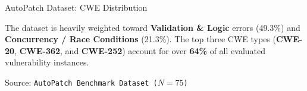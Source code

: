 \documentclass[aspectratio=169,10pt]{beamer}
\begin{document}
\begin{frame}{AutoPatch Dataset: CWE Distribution}
  \vspace{0.25em}
  \begin{tcolorbox}[colback=hit!5, colframe=hit!70!black, boxrule=0.35pt,
    left=3pt, right=3pt, top=2pt, bottom=1pt, arc=2pt, width=\linewidth]
    \scriptsize
    The dataset is heavily weighted toward \textbf{Validation \& Logic} errors (49.3\%) and \textbf{Concurrency / Race Conditions} (21.3\%). The top three CWE types (\textbf{CWE-20}, \textbf{CWE-362}, and \textbf{CWE-252}) account for over \textbf{64\%} of all evaluated vulnerability instances.
  \end{tcolorbox}

  \vspace{0.15em}
  {\scriptsize\textcolor{notecol}{Source: \texttt{AutoPatch Benchmark Dataset ($N=75$)}}}

\end{frame}
\end{document}
